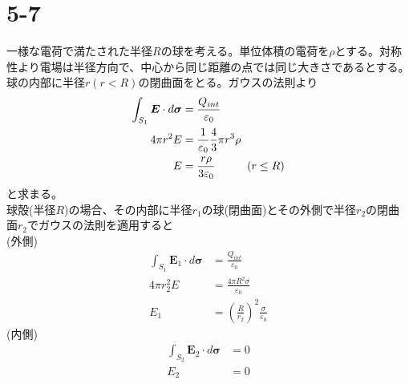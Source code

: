 \documentclass{jsarticle}
\begin{document}
\newpage
\section*{5-7}
\noindent
一様な電荷で満たされた半径\(R\)の球を考える。単位体積の電荷を\(\rho\)とする。対称性より電場は半径方向で、中心から同じ距離の点では同じ大きさであるとする。\\
球の内部に半径\(r(r<R)\)の閉曲面をとる。ガウスの法則より
\begin{align*}
\int_{S_{1}}\bm{E}\cdot d\bm{\sigma}&=\frac{Q_{int}}{\varepsilon_{0}}\\
4\pi r^{2}E&=\frac{1}{\varepsilon_{0}}\frac{4}{3}\pi r^{3}\rho\\
E&=\frac{r\rho}{3\varepsilon_{0}}\hspace{10mm}(r\leq R)
\end{align*}
と求まる。\\
球殻(半径\(R\))の場合、その内部に半径\(r_{1}\)の球(閉曲面)とその外側で半径\(r_{2}\)の閉曲面\(r_{2}\)でガウスの法則を適用すると\\
(外側)
\begin{align*}
\int_{S_{1}}\bm{E}_{1}\cdot d\bm{\sigma}&=\frac{Q_{int}}{\varepsilon_{0}}\\
4\pi r_{2}^{2}E&=\frac{4\pi R^{2}\sigma}{\varepsilon_{0}}\\
E_{1}&=\left(\frac{R}{r_{2}}\right)^{2}\frac{\sigma}{\varepsilon_{0}}
\end{align*}
(内側)
\begin{align*}
\int_{S_{2}}\bm{E}_{2}\cdot d\bm{\sigma}&=0\\
E_{2}&=0
\end{align*}

\newpage
\end{document}
